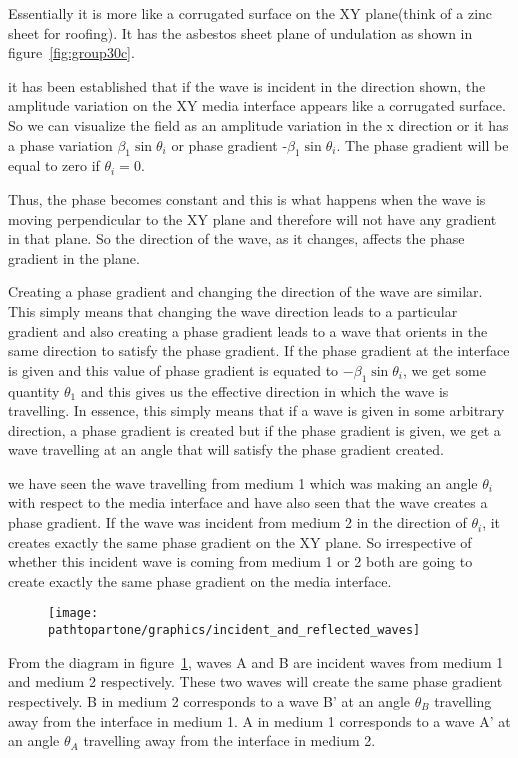 Essentially it is more like a corrugated surface on the XY plane(think of a zinc sheet for roofing). It has the asbestos sheet plane of undulation as shown in figure~\ref{fig:group30c}.

it has been established that if the wave is incident in the direction shown, the amplitude variation on the XY media interface appears like a corrugated surface. So we can visualize the field as an amplitude variation in the x direction or it has a phase variation $\beta_1\sin \theta_i$ or phase gradient -$\beta_1\sin\theta_i$. The phase gradient will be equal to zero if $\theta_i=0$.

Thus, the phase becomes constant and this is what happens when the wave is moving perpendicular to the XY plane and therefore will not have any gradient in that plane. So the direction of the wave, as it changes, affects the phase gradient in the plane.

Creating a phase gradient and changing the direction of the wave are similar. This simply means that changing the wave direction leads to a particular gradient and also creating a phase gradient leads to a wave that orients in the same direction to satisfy the phase gradient. If the phase gradient at the interface is given and this value of phase gradient is equated to $-\beta_1 \sin \theta_i$, we get some quantity $\theta_1$ and this gives us the effective direction in which the wave is travelling. In essence, this simply means that if a wave is given in some arbitrary direction, a phase gradient is created but if the phase gradient is given, we get a wave travelling at an angle that will satisfy the phase gradient created.

we have seen the wave travelling from medium 1  which was making an angle $\theta_i$ with respect to the media interface and have also seen that the wave creates a phase gradient. If the wave was incident from medium 2 in the direction of $\theta_i$, it creates exactly the same phase gradient on the XY plane. So irrespective of whether this incident wave is coming from medium 1 or 2 both are going to create exactly the same phase gradient on the media interface.
\begin{figure}[h]
\centering
\texttt{[image: \\pathtopartone/graphics/incident\_and\_reflected\_waves]}
\caption{}
\label{fig:group30d---copy}
\end{figure}

From the diagram in figure~\ref{fig:group30d---copy}, waves A and B are incident waves from medium 1 and medium 2 respectively. These two waves will create the same phase gradient respectively. B in medium 2 corresponds to a wave B'  at an angle $\theta_B$ travelling away from the interface in medium 1. A in medium 1 corresponds to a wave A' at an angle $\theta_A$ travelling away from the interface in medium 2.

